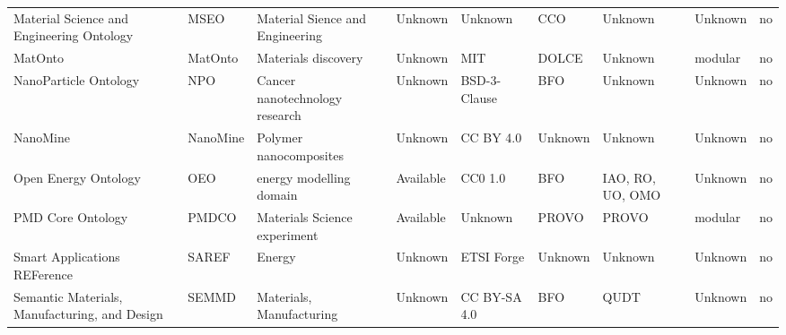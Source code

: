 \begin{tabular}{m{5cm}m{2cm}m{5cm}m{2cm}m{2cm}m{2cm}m{2cm}m{2cm}m{2cm}}
                            Material Science and Engineering Ontology \cite{mseo} &                    MSEO &                                                   Material Sience and Engineering &              Unknown &      Unknown &                          CCO &           Unknown &    Unknown &               no \\
                                                                          MatOnto &                 MatOnto &                                                               Materials discovery &              Unknown &         MIT  &                        DOLCE &           Unknown &    modular &               no \\
                                        NanoParticle Ontology \cite{npo_ontology} &                     NPO &                                                    Cancer nanotechnology research &              Unknown & BSD-3-Clause &                          BFO &           Unknown &    Unknown &               no \\
                                                NanoMine \cite{nanomine_ontology} &                NanoMine &                                                            Polymer nanocomposites &              Unknown &    CC BY 4.0 &                      Unknown &           Unknown &    Unknown &               no \\
                                         Open Energy Ontology \cite{oeo_ontology} &                     OEO &                                                           energy modelling domain &            Available &      CC0 1.0 &                          BFO &  IAO, RO, UO, OMO &    Unknown &               no \\
                                                   PMD Core Ontology \cite{pmdco} &                   PMDCO &                                                      Materials Science experiment &            Available &      Unknown &                        PROVO &             PROVO &    modular &               no \\
                               Smart Applications REFerence \cite{saref_ontology} &                   SAREF &                                                                            Energy &              Unknown &   ETSI Forge &                      Unknown &           Unknown &    Unknown &               no \\
                                    Semantic Materials, Manufacturing, and Design &                   SEMMD &                                                          Materials, Manufacturing &              Unknown & CC BY-SA 4.0 &                          BFO &              QUDT &    Unknown &               no \\

\end{tabular}
